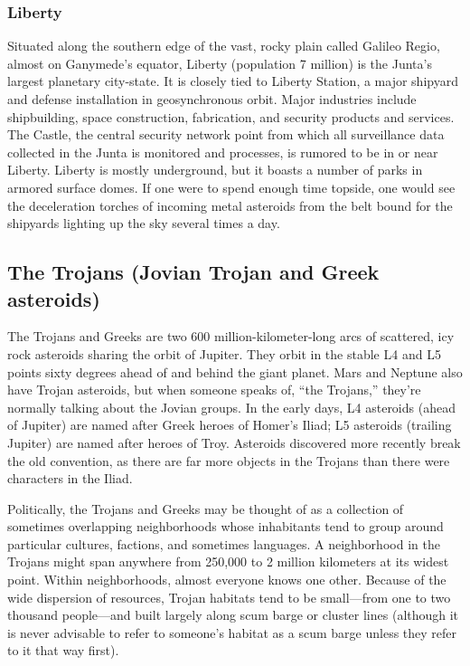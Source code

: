 \subsubsection{Liberty} \label{sec:liberty} 

Situated along the southern edge of the vast, rocky plain called Galileo Regio, almost on Ganymede's equator, Liberty (population 7 million) is the Junta's largest planetary city-state. It is closely tied to Liberty Station, a major shipyard and defense installation in geosynchronous orbit. Major industries include shipbuilding, space construction, fabrication, and security products and services. The Castle, the central security network point from which all surveillance data collected in the Junta is monitored and processes, is rumored to be in or near Liberty. Liberty is mostly underground, but it boasts a number of parks in armored surface domes. If one were to spend enough time topside, one would see the deceleration torches of incoming metal asteroids from the belt bound for the shipyards lighting up the sky several times a day. 

\subsection{The Trojans (Jovian Trojan and Greek asteroids)} \label{sec:troj-jovi-troj} 

The Trojans and Greeks are two 600 million-kilometer-long arcs of scattered, icy rock asteroids sharing the orbit of Jupiter. They orbit in the stable L4 and L5 points sixty degrees ahead of and behind the giant planet. Mars and Neptune also have Trojan asteroids, but when someone speaks of, “the Trojans,” they're normally talking about the Jovian groups. In the early days, L4 asteroids (ahead of Jupiter) are named after Greek heroes of Homer's Iliad; L5 asteroids (trailing Jupiter) are named after heroes of Troy. Asteroids discovered more recently break the old convention, as there are far more objects in the Trojans than there were characters in the Iliad. 

Politically, the Trojans and Greeks may be thought of as a collection of sometimes overlapping neighborhoods whose inhabitants tend to group around particular cultures, factions, and sometimes languages. A neighborhood in the Trojans might span anywhere from 250,000 to 2 million kilometers at its widest point. Within neighborhoods, almost everyone knows one other. Because of the wide dispersion of resources, Trojan habitats tend to be small—from one to two thousand people—and built largely along scum barge or cluster lines (although it is never advisable to refer to someone's habitat as a scum barge unless they refer to it that way first). 

